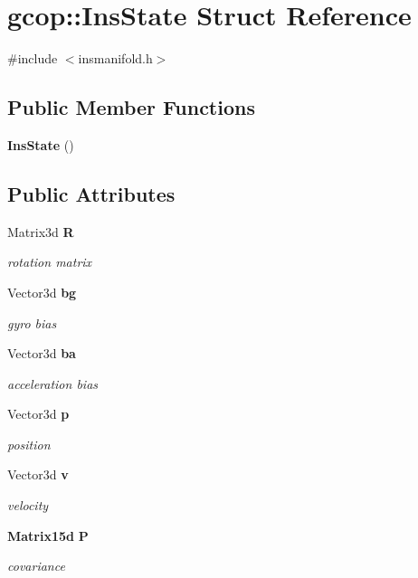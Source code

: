 \section{gcop\-:\-:\-Ins\-State \-Struct \-Reference}
\label{structgcop_1_1InsState}


{\ttfamily \#include $<$insmanifold.\-h$>$}

\subsection*{\-Public \-Member \-Functions}
\begin{DoxyCompactItemize}
\item 
{\bf \-Ins\-State} ()
\end{DoxyCompactItemize}
\subsection*{\-Public \-Attributes}
\begin{DoxyCompactItemize}
\item 
\-Matrix3d {\bf \-R}
\begin{DoxyCompactList}\small\item\em rotation matrix \end{DoxyCompactList}\item 
\-Vector3d {\bf bg}
\begin{DoxyCompactList}\small\item\em gyro bias \end{DoxyCompactList}\item 
\-Vector3d {\bf ba}
\begin{DoxyCompactList}\small\item\em acceleration bias \end{DoxyCompactList}\item 
\-Vector3d {\bf p}
\begin{DoxyCompactList}\small\item\em position \end{DoxyCompactList}\item 
\-Vector3d {\bf v}
\begin{DoxyCompactList}\small\item\em velocity \end{DoxyCompactList}\item 
{\bf \-Matrix15d} {\bf \-P}
\begin{DoxyCompactList}\small\item\em covariance \end{DoxyCompactList}\end{DoxyCompactItemize}


